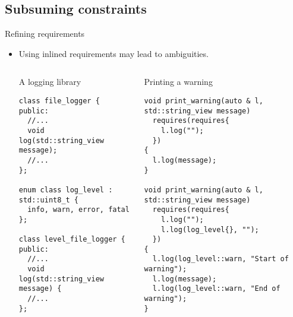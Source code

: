 \subsection{Subsuming constraints}

\begin{frame}[t,fragile]{Refining requirements}
\begin{itemize}
  \item Using inlined requirements may lead to ambiguities.

\begin{columns}[T]

\begin{block}{A logging library}
\begin{lstlisting}[basicstyle=\tiny]
class file_logger {
public:
  //...
  void log(std::string_view message);
  //...
};

enum class log_level : std::uint8_t { 
  info, warn, error, fatal };

class level_file_logger {
public:
  //...
  void log(std::string_view message) {
  //...
};
\end{lstlisting}
\end{block}

\begin{block}{Printing a warning}
\begin{lstlisting}[basicstyle=\tiny]
void print_warning(auto & l, std::string_view message)
  requires(requires{
    l.log("");
  })
{
  l.log(message);
}

void print_warning(auto & l, std::string_view message)
  requires(requires{
    l.log("");
    l.log(log_level{}, "");
  })
{
  l.log(log_level::warn, "Start of warning");
  l.log(message);
  l.log(log_level::warn, "End of warning");
}
\end{lstlisting}
\end{block}

\end{columns}

\end{itemize}
\end{frame}

